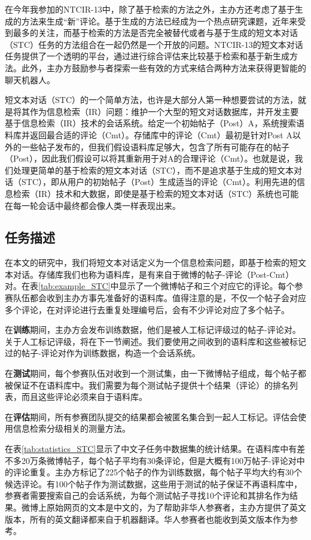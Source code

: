 在今年我参加的NTCIR-13中，除了基于检索的方法之外，主办方还考虑了基于生成的方法来生成“新”评论。基于生成的方法已经成为一个热点研究课题，近年来受到最多的关注，而基于检索的方法是否完全被替代或者与基于生成的短文本对话（STC）任务的方法组合在一起仍然是一个开放的问题。NTCIR-13的短文本对话任务提供了一个透明的平台，通过进行综合评估来比较基于检索和基于新生成方法。此外，主办方鼓励参与者探索一些有效的方式来结合两种方法来获得更智能的聊天机器人。

短文本对话（STC）的一个简单方法，也许是大部分人第一种想要尝试的方法，就是将其作为信息检索（IR）问题：维护一个大型的短文对话数据库，并开发主要基于信息检索（IR）技术的会话系统。给定一个初始帖子（Post）A，系统搜索语料库并返回最合适的评论（Cmt）。存储库中的评论（Cmt）最初是针对Post A以外的一些帖子发布的，但我们假设语料库足够大，包含了所有可能存在的帖子（Post），因此我们假设可以将其重新用于对A的合理评论（Cmt）。也就是说，我们处理更简单的基于检索的短文本对话（STC），而不是追求基于生成的短文本对话（STC），即从用户的初始帖子（Post）生成适当的评论（Cmt）。利用先进的信息检索（IR）技术和大数据，即使是基于检索的短文本对话（STC）系统也可能在每一轮会话中最终都会像人类一样表现出来。

\subsection{任务描述}
在本文的研究中，我们将短文本对话定义为一个信息检索问题，即基于检索的短文本对话。存储库我们也称为语料库，是有来自于微博的帖子-评论（Post-Cmt）对。在表\ref{tab:example_STC}中显示了一个微博帖子和三个对应它的评论。每个参赛队伍都会收到主办方事先准备好的语料库。值得注意的是，不仅一个帖子会对应多个评论，在对评论进行去重复处理编号后，会有不少评论对应了多个帖子。

在\textbf{训练}期间，主办方会发布训练数据，他们是被人工标记评级过的帖子-评论对。关于人工标记评级，将在下一节阐述。我们要使用之间收到的语料库和这些被标记过的帖子-评论对作为训练数据，构造一个会话系统。
 
在\textbf{测试}期间，每个参赛队伍对收到一个测试集，由一下微博帖子组成，每个帖子都被保证不在语料库中。我们需要为每个测试帖子提供十个结果（评论）的排名列表，而且这些评论必须来自于语料库。

在\textbf{评估}期间，所有参赛团队提交的结果都会被匿名集合到一起人工标记。评估会使用信息检索分级相关的测量方法。

在表\ref{tab:statistics_STC}显示了中文子任务中数据集的统计结果。在语料库中有差不多20万条微博帖子，每个帖子平均有30条评论，但是大概有100万帖子-评论对中的评论重复。主办方标记了225个帖子的作为训练数据，每个帖子平均大约有30个候选评论。有100个帖子作为测试数据，这些用于测试的帖子保证不再语料库中，参赛者需要搜索自己的会话系统，为每个测试帖子寻找10个评论和其排名作为结果。微博上原始网页的文本是中文的，为了帮助非华人参赛者，主办方提供了英文版本，所有的英文翻译都来自于机器翻译。华人参赛者也能收到英文版本作为参考。


